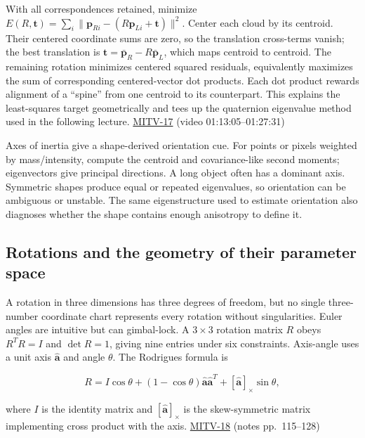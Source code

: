 With all correspondences retained, minimize \(E(R,\mathbf{t})=\sum_i\|\mathbf{p}_{Ri}-(R\mathbf{p}_{Li}+\mathbf{t})\|^2\). Center each cloud by its centroid. Their centered coordinate sums are zero, so the translation cross-terms vanish; the best translation is \(\mathbf{t}=\bar{\mathbf{p}}_R-R\bar{\mathbf{p}}_L\), which maps centroid to centroid. The remaining rotation minimizes centered squared residuals, equivalently maximizes the sum of corresponding centered-vector dot products. Each dot product rewards alignment of a ``spine'' from one centroid to its counterpart. This explains the least-squares target geometrically and tees up the quaternion eigenvalue method used in the following lecture. \hyperref[04-visual-computing-ii-ch036-mitv-17---photogrammetry-orientation-axes-of-inertia-symmetry-orientation]{MITV-17} (video 01:13:05--01:27:31)

Axes of inertia give a shape-derived orientation cue. For points or pixels weighted by mass/intensity, compute the centroid and covariance-like second moments; eigenvectors give principal directions. A long object often has a dominant axis. Symmetric shapes produce equal or repeated eigenvalues, so orientation can be ambiguous or unstable. The same eigenstructure used to estimate orientation also diagnoses whether the shape contains enough anisotropy to define it.

\subsection{Rotations and the geometry of their parameter space}\label{04-visual-computing-ii-ch032-rotations-and-the-geometry-of-their-parameter-space}

A rotation in three dimensions has three degrees of freedom, but no single three-number coordinate chart represents every rotation without singularities. Euler angles are intuitive but can gimbal-lock. A \(3\times3\) rotation matrix \(R\) obeys \(R^TR=I\) and \(\det R=1\), giving nine entries under six constraints. Axis-angle uses a unit axis \(\hat{\mathbf{a}}\) and angle \(\theta\). The Rodrigues formula is

\[
R=I\cos\theta +(1-\cos\theta)\hat{\mathbf{a}}\hat{\mathbf{a}}^T+[\hat{\mathbf{a}}]_\times\sin\theta,
\]

where \(I\) is the identity matrix and \([\hat{\mathbf{a}}]_\times\) is the skew-symmetric matrix implementing cross product with the axis. \hyperref[04-visual-computing-ii-ch036-mitv-18---rotation-and-how-to-represent-it-unit-quaternions-the-space-of-rotations]{MITV-18} (notes pp.~115--128)

